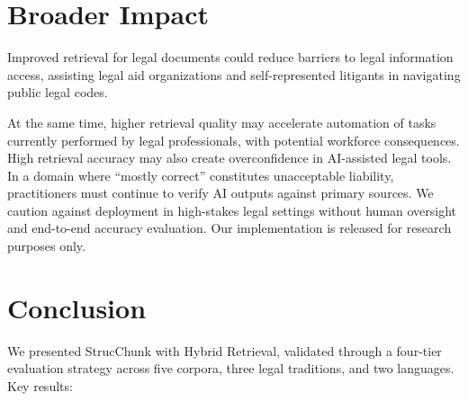 \documentclass[sn-mathphys,Numbered]{sn-jnl}%
\begin{document}
\section{Broader Impact}
\label{sec:impact}

Improved retrieval for legal documents could reduce barriers to legal
information access, assisting legal aid organizations and
self-represented litigants in navigating public legal codes.

At the same time, higher retrieval quality may accelerate automation of
tasks currently performed by legal professionals, with potential workforce
consequences.  High retrieval accuracy may also create overconfidence in
AI-assisted legal tools.  In a domain where ``mostly correct'' constitutes
unacceptable liability, practitioners must continue to verify AI outputs
against primary sources.  We caution against deployment in high-stakes
legal settings without human oversight and end-to-end accuracy evaluation.
Our implementation is released for research purposes only.

\section{Conclusion}
\label{sec:conclusion}

We presented StrucChunk with Hybrid Retrieval, validated through a
four-tier evaluation strategy across five corpora, three legal traditions,
and two languages.  Key results:
\end{document}
